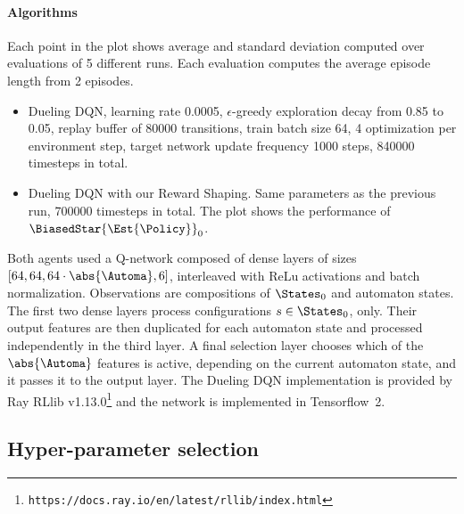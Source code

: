 \paragraph{Algorithms}
Each point in the plot shows average and standard deviation computed over evaluations of 5 different runs.
Each evaluation computes the average episode length from 2 episodes.
\begin{itemize}
	\item Dueling DQN,
		learning rate 0.0005, 
		$\epsilon$-greedy exploration decay from 0.85 to 0.05,
		replay buffer of 80000 transitions,
		train batch size 64, 4 optimization per environment step,
		target network update frequency 1000 steps,
		840000 timesteps in total.
	\item Dueling DQN with our Reward Shaping.
		Same parameters as the previous run,
		700000 timesteps in total.
		The plot shows the performance of~$\BiasedStar{\Est{\Policy}}_0$.
\end{itemize}

Both agents used a Q-network composed of dense layers of sizes $[64, 64, 64\cdot\abs{\Automa}, 6]$,
interleaved with ReLu activations and batch normalization.
Observations are compositions of $\States_0$ and automaton states.
The first two dense layers process configurations $s \in \States_0$, only.
Their output features are then duplicated for each automaton state and processed independently in the third layer.
A final selection layer chooses which of the $\abs{\Automa}$ features is active, depending on the current automaton state, and it passes it to the output layer.
The Dueling DQN implementation is provided by Ray RLlib v1.13.0\footnote{\texttt{https://docs.ray.io/en/latest/rllib/index.html}}
and the network is implemented in Tensorflow~2.


\subsection{Hyper-parameter selection}

